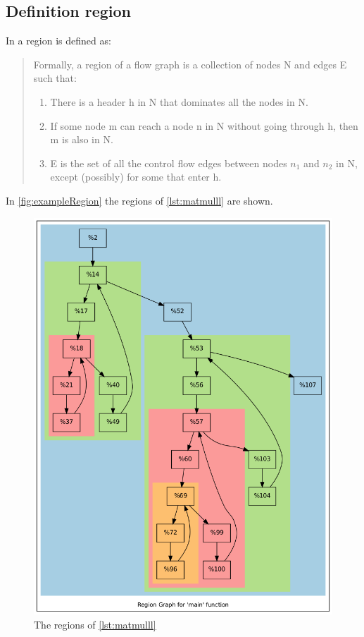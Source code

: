 \subsection{Definition region}\label{subsec:definitionRegion}
In \cite[chapter 9.7.1, p.~672]{Drachenbuch} a region is defined as:

\begin{quote}
    Formally, a region of a flow graph is a collection of nodes N and edges E such that:
    \begin{enumerate}
        \item There is a header h in N that dominates all the nodes in N.
        \item If some node m can reach a node n in N without going through h, then m is also in N.
        \item E is the set of all the control flow edges between nodes \(n_1\) and \(n_2\) in N, except (possibly) for some that enter h.
    \end{enumerate}
\end{quote}
In \autoref{fig:exampleRegion} the regions of \autoref{lst:matmulll} are shown.
\begin{figure}[!ht]
    \centering
    \caption{The regions of \autoref{lst:matmulll}}
    \label{fig:exampleRegion}
    \includegraphics[width=\textwidth]{gfx/matmulRegions.png}
\end{figure}\\
